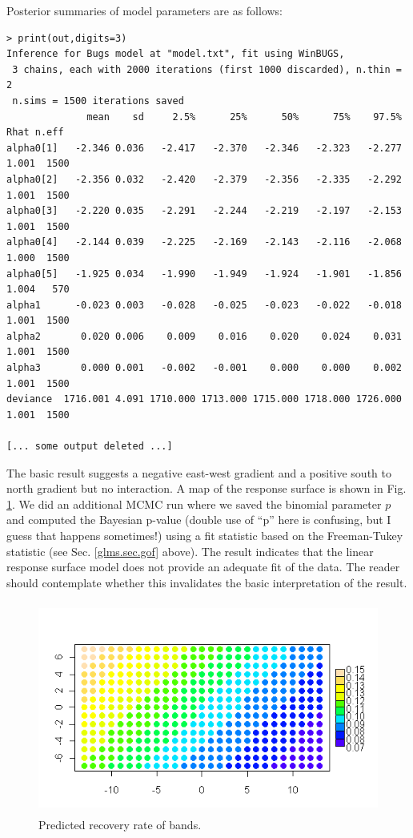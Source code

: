 Posterior summaries of model parameters are as follows:
{\small
\begin{verbatim}
> print(out,digits=3)
Inference for Bugs model at "model.txt", fit using WinBUGS,
 3 chains, each with 2000 iterations (first 1000 discarded), n.thin = 2
 n.sims = 1500 iterations saved
              mean    sd     2.5%      25%      50%      75%    97.5%  Rhat n.eff
alpha0[1]   -2.346 0.036   -2.417   -2.370   -2.346   -2.323   -2.277 1.001  1500
alpha0[2]   -2.356 0.032   -2.420   -2.379   -2.356   -2.335   -2.292 1.001  1500
alpha0[3]   -2.220 0.035   -2.291   -2.244   -2.219   -2.197   -2.153 1.001  1500
alpha0[4]   -2.144 0.039   -2.225   -2.169   -2.143   -2.116   -2.068 1.000  1500
alpha0[5]   -1.925 0.034   -1.990   -1.949   -1.924   -1.901   -1.856 1.004   570
alpha1      -0.023 0.003   -0.028   -0.025   -0.023   -0.022   -0.018 1.001  1500
alpha2       0.020 0.006    0.009    0.016    0.020    0.024    0.031 1.001  1500
alpha3       0.000 0.001   -0.002   -0.001    0.000    0.000    0.002 1.001  1500
deviance  1716.001 4.091 1710.000 1713.000 1715.000 1718.000 1726.000 1.001  1500

[... some output deleted ...]
\end{verbatim}
}

The basic result suggests a negative east-west gradient and a positive
south to north gradient but no interaction. A map of the response
surface is shown in Fig. \ref{glms.fig.bandrecovery}.
 We did an additional MCMC run where we saved the binomial
parameter $p$ and computed the Bayesian p-value (double use of ``p''
here is confusing, but I guess that happens sometimes!)
using a fit statistic based on the Freeman-Tukey
statistic (see Sec. \ref{glms.sec.gof}
above). The result indicates that the
linear response surface model does not provide an adequate fit of the
data. The reader should contemplate whether this invalidates the basic
interpretation of the result.


\begin{figure}
\begin{center}
\includegraphics[height=2.75in]{Ch2/figs/responsesurface}
\end{center}
\caption{Predicted recovery rate of bands.}
\label{glms.fig.bandrecovery}
\end{figure}

